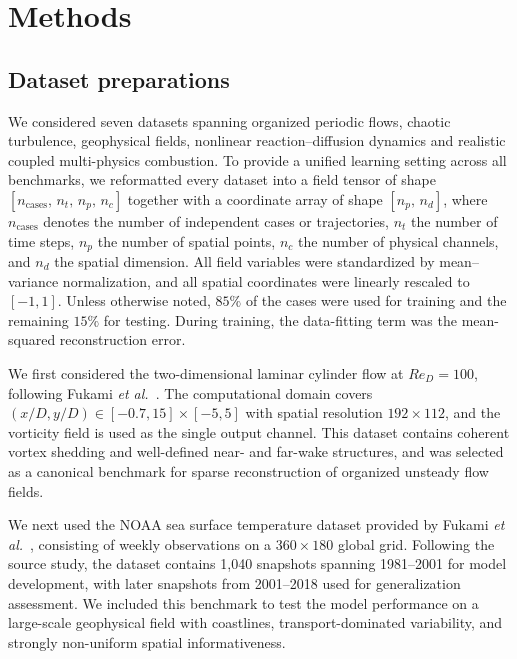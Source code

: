 \documentclass[pdflatex,sn-nature]{sn-jnl}%
\begin{document}
\section*{Methods}
\label{sec: Methods}

\subsection*{Dataset preparations}
\label{subsec: Datasets}

We considered seven datasets spanning organized periodic flows, chaotic turbulence, geophysical fields, nonlinear reaction--diffusion dynamics and realistic coupled multi-physics combustion.
To provide a unified learning setting across all benchmarks, we reformatted every dataset into a field tensor of shape $[n_{\mathrm{cases}},\, n_t,\, n_p,\, n_c]$ together with a coordinate array of shape $[n_p,\, n_d]$, where $n_{\mathrm{cases}}$ denotes the number of independent cases or trajectories, $n_t$ the number of time steps, $n_p$ the number of spatial points, $n_c$ the number of physical channels, and $n_d$ the spatial dimension. 
All field variables were standardized by mean--variance normalization, and all spatial coordinates were linearly rescaled to $[-1,1]$. 
Unless otherwise noted, $85\%$ of the cases were used for training and the remaining $15\%$ for testing. 
During training, the data-fitting term was the mean-squared reconstruction error. 

We first considered the two-dimensional laminar cylinder flow at $Re_D=100$, following Fukami \emph{et al.}~\cite{fukami2021global}. 
The computational domain covers $(x/D,y/D)\in[-0.7,15]\times[-5,5]$ with spatial resolution $192\times112$, and the vorticity field is used as the single output channel. This dataset contains coherent vortex shedding and well-defined near- and far-wake structures, and was selected as a canonical benchmark for sparse reconstruction of organized unsteady flow fields.

We next used the NOAA sea surface temperature dataset provided by Fukami \emph{et al.}~\cite{fukami2021global}, consisting of weekly observations on a $360\times180$ global grid. 
Following the source study, the dataset contains 1,040 snapshots spanning 1981--2001 for model development, with later snapshots from 2001--2018 used for generalization assessment. 
We included this benchmark to test the model performance on a large-scale geophysical field with coastlines, transport-dominated variability, and strongly non-uniform spatial informativeness.
\end{document}
